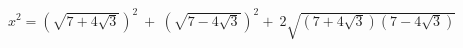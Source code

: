 \documentclass[preview]{standalone}
\begin{document}
\begin{align*}
x^2 = \left(\sqrt{7 + 4 \sqrt{3}}\right)^2 \ + \ \left(\sqrt{7 - 4  \sqrt{3}}\right)^2 + \ 2\sqrt{\left(7+4\sqrt{3}\right)\left(7-4\sqrt{3}\right)}
\end{align*}
\end{document}
